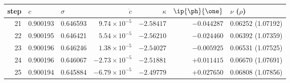 \begin{tabular}{@{}rllrrrl@{}}
\toprule
step & $c$ & $\sigma$ & $\dot c$ & $\kappa$ & $\ip{\ph}{\one}$ & $\nu$ ($\rho$)\\
\midrule
21 & 0.900193 & 0.646593 & $9.74\times10^{-5}$ & $-2.58417$ & $-0.044287$ & 0.06252 (1.07192)\\
22 & 0.900195 & 0.646421 & $5.54\times10^{-5}$ & $-2.56210$ & $-0.024460$ & 0.06392 (1.07359)\\
23 & 0.900196 & 0.646246 & $1.38\times10^{-5}$ & $-2.54027$ & $-0.005925$ & 0.06531 (1.07525)\\
24 & 0.900196 & 0.646067 & $-2.73\times10^{-5}$ & $-2.51881$ & $+0.011415$ & 0.06670 (1.07691)\\
25 & 0.900194 & 0.645884 & $-6.79\times10^{-5}$ & $-2.49779$ & $+0.027650$ & 0.06808 (1.07856)\\
\bottomrule
\end{tabular}
